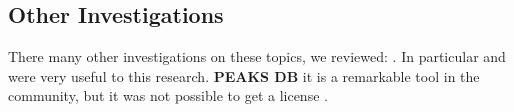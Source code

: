 \subsection{Other Investigations}
\label{section:other-investigations}
There many other investigations on these topics, we reviewed: \cite{Danick1999DeSpectrometry, Chen2001ASpectrometry, Guthals2015TheNetworks, Bandeira2008Multi-spectraSpectrometry, Lu2003ASpectrometry, Taylor1997SequenceSpectrometry, Johnson2002SearchingSpectrometry., Taylor2001ImplementationSpectrometry., Grossmann2005AUDENS:Sequencing, Fischer2005NovoHMM:Sequencing}.
In particular \citeauthor{Chen2001ASpectrometry} \cite{Chen2001ASpectrometry} and \citeauthor{Bandeira2008Multi-spectraSpectrometry} \cite{Bandeira2008Multi-spectraSpectrometry} were very useful to this research. \textbf{PEAKS DB} it is a remarkable tool in the community, but it was not possible to get a license  \cite{Zhang2012PEAKSIdentification}.